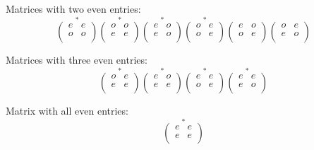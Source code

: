\documentclass[12pt]{article}
\begin{document}
Matrices with two even entries:
\[
\stackrel{*}
{
\left(\begin{matrix}
e & e \\
o & o \\
\end{matrix}\right)
}
\stackrel{*}
{
\left(\begin{matrix}
o & o \\
e & e \\
\end{matrix}\right)
}
\stackrel{*}
{
\left(\begin{matrix}
e & o \\
e & o \\
\end{matrix}\right)
}
\stackrel{*}
{
\left(\begin{matrix}
o & e \\
o & e \\
\end{matrix}\right)
}
\left(\begin{matrix}
e & o \\
o & e \\
\end{matrix}\right)
\left(\begin{matrix}
o & e \\
e & o \\
\end{matrix}\right)
\]

Matrices with three even entries:
\[
\stackrel{*}
{
\left(\begin{matrix}
o & e \\
e & e \\
\end{matrix}\right)
}
\stackrel{*}
{
\left(\begin{matrix}
e & o \\
e & e \\
\end{matrix}\right)
}
\stackrel{*}
{
\left(\begin{matrix}
e & e \\
o & e \\
\end{matrix}\right)
}
\stackrel{*}
{
\left(\begin{matrix}
e & e \\
e & o \\
\end{matrix}\right)
}
\]

Matrix with all even entries:
\[
\stackrel{*}
{
\left(\begin{matrix}
e & e \\
e & e \\
\end{matrix}\right)
}
\]
\end{document}

